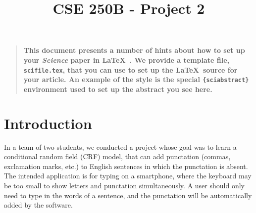 \documentclass[12pt]{article}
\title{CSE 250B - Project 2}
\author
{Sigurd Lund,$^{\ast}$ Thomas Wolff$^{}$$\\
\normalsize{$^\ast$To whom correspondence should be addressed; E-mail:  sigurd.l@gmail.com.}
}
\date{}
\newenvironment{sciabstract}{%
\begin{quote} \bf}
{\end{quote}}
\begin{document}
 


\baselineskip24pt


\maketitle 




\begin{sciabstract}
  This document presents a number of hints about how to set up your
  {\it Science\/} paper in \LaTeX\ .  We provide a template file,
  \texttt{scifile.tex}, that you can use to set up the \LaTeX\ source
  for your article.  An example of the style is the special
  \texttt{\{sciabstract\}} environment used to set up the abstract you
  see here.
\end{sciabstract}




\section*{Introduction}
In a team of two students, we conducted a project whose goal was to learn a conditional random field (CRF) model, that can add punctation (commas, exclamation marks, etc.) to English sentences in which the punctation is absent. The intended application is for typing on a smartphone, where the keyboard may be too small to show letters and punctation simultaneously. A user should only need to type in the words of a sentence, and the punctation will be automatically added by the software.
\end{document}
